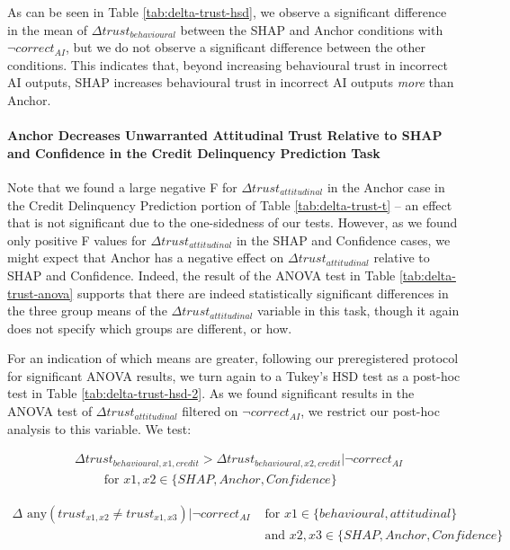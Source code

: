 As can be seen in Table \ref{tab:delta-trust-hsd}, we observe a significant difference in the mean of $\Delta trust_{behavioural}$ between the SHAP and Anchor conditions with $\neg correct_{AI}$, but we do not observe a significant difference between the other conditions. This indicates that, beyond increasing behavioural trust in incorrect AI outputs, SHAP increases behavioural trust in incorrect AI outputs \emph{more} than Anchor.

\paragraph{Anchor Decreases Unwarranted Attitudinal Trust Relative to SHAP and Confidence in the Credit Delinquency Prediction Task}
Note that we found a large negative F for $\Delta trust_{attitudinal}$ in the Anchor case in the Credit Delinquency Prediction portion of Table \ref{tab:delta-trust-t} – an effect that is not significant due to the one-sidedness of our tests. However, as we found only positive F values for $\Delta trust_{attitudinal}$ in the SHAP and Confidence cases, we might expect that Anchor has a negative effect on $\Delta trust_{attitudinal}$ relative to SHAP and Confidence. Indeed, the result of the ANOVA test in Table \ref{tab:delta-trust-anova} supports that there are indeed statistically significant differences in the three group means of the $\Delta trust_{attitudinal}$ variable in this task, though it again does not specify which groups are different, or how.

For an indication of which means are greater, following our preregistered protocol for significant ANOVA results, we turn again to a Tukey's HSD test as a post-hoc test in Table \ref{tab:delta-trust-hsd-2}. As we found significant results in the ANOVA test of $\Delta trust_{attitudinal}$ filtered on $\neg correct_{AI}$, we restrict our post-hoc analysis to this variable. We test:

\begin{equation}
    \begin{split}
        & \Delta trust_{behavioural,x1,credit} > \Delta trust_{behavioural,x2,credit} | \neg correct_{AI} \\
        & \qquad \text{ for } x1,x2 \in \{SHAP, Anchor, Confidence\}
    \end{split}
\end{equation}

\begin{equation}
    \begin{split}
        \Delta \text{ any}(trust_{x1,x2} \neq trust_{x1,x3}) | \neg correct_{AI} & \text{ for } x1 \in \{behavioural, attitudinal\} \\
        & \text{ and } x2,x3 \in \{SHAP, Anchor, Confidence\}
    \end{split}
\end{equation}

